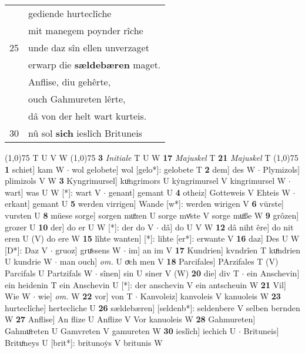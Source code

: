 \documentclass[8pt,a4paper,notitlepage]{article}
\begin{document}
\begin{table}[ht]
\begin{minipage}[t]{0.5\linewidth}
\begin{tabular}{rl}
 & gediende hurteclîche\\ 
 & mit manegem poynder rîche\\ 
25 & unde daz sîn ellen unverzaget\\ 
 & erwarp die \textbf{sældebæren} maget.\\ 
 & Anflise, diu gehêrte,\\ 
 & ouch Gahmureten lêrte,\\ 
 & dâ von der helt wart kurteis.\\ 
30 & nû sol \textbf{sich} ieslîch Brituneis\\ 
\end{tabular}
\scriptsize
\line(1,0){75} \newline
T U V W \newline
\line(1,0){75} \newline
\textbf{3} \textit{Initiale} T U W  \textbf{17} \textit{Majuskel} T  \textbf{21} \textit{Majuskel} T  \newline
\line(1,0){75} \newline
\textbf{1} schiet] kam W  $\cdot$ wol gelobete] wol [gelo*]: gelobete T \textbf{2} dem] des W  $\cdot$ Plymizols] plimizols V W \textbf{3} Kyngrimursel] kuͦngrimors U kẏngrimursel V kingrimursel W  $\cdot$ wart] was U W [*]: wart V  $\cdot$ genant] gemant U \textbf{4} otheiz] Gotteweis V Ehteis W  $\cdot$ erkant] gemant U \textbf{5} werden virrigen] Wande [w*]: werden wirigen V \textbf{6} vürste] vursten U \textbf{8} müese sorge] sorgen muͦzen U sorge mvͤste V sorge muͦße W \textbf{9} grôzen] grozer U \textbf{10} der] do er U W [*]: der do V  $\cdot$ dâ] do U V W \textbf{12} dâ niht êre] do nit eren U (V) do ere W \textbf{15} lîhte wanten] [*]: lihte [er*]: erwante V \textbf{16} daz] Des U W [D*]: Daz V  $\cdot$ gruoz] gruͤssens W  $\cdot$ im] an im V \textbf{17} Kundrien] kvndrîen T kuͦndrien U kundrie W  $\cdot$ man ouch] \textit{om.} U oͮch men V \textbf{18} Parcifales] PArzifales T (V) Parcifals U Partzifals W  $\cdot$ sînen] sin U siner V (W) \textbf{20} die] div T  $\cdot$ ein Anschevin] ein heidenin T ein Anschevin U [*]: der anschevin V ein antscheuin W \textbf{21} Vil] Wie W  $\cdot$ wie] \textit{om.} W \textbf{22} vor] von T  $\cdot$ Kanvoleiz] kanvoleis V kanuoleis W \textbf{23} hurteclîche] hertecliche U \textbf{26} sældebæren] [seldenb*]: seldenbere V selben bernden W \textbf{27} Anflise] An flize U Anflize V Vor kanuoleis W \textbf{28} Gahmureten] Gahmuͦreten U Gamvreten V gamureten W \textbf{30} ieslîch] iechich U  $\cdot$ Brituneis] Brituͦneys U [brit*]: britunoẏs V britunis W \newline
\end{minipage}
\end{table}
\end{document}
